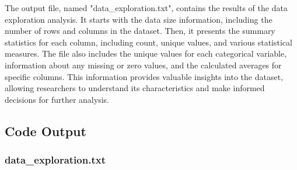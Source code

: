 \documentclass[11pt]{article}
\begin{document}
The output file, named "data\_exploration.txt", contains the results of the data exploration analysis. It starts with the data size information, including the number of rows and columns in the dataset. Then, it presents the summary statistics for each column, including count, unique values, and various statistical measures. The file also includes the unique values for each categorical variable, information about any missing or zero values, and the calculated averages for specific columns. This information provides valuable insights into the dataset, allowing researchers to understand its characteristics and make informed decisions for further analysis.

\subsection{Code Output}

\subsubsection*{data\_exploration.txt}
\end{document}
